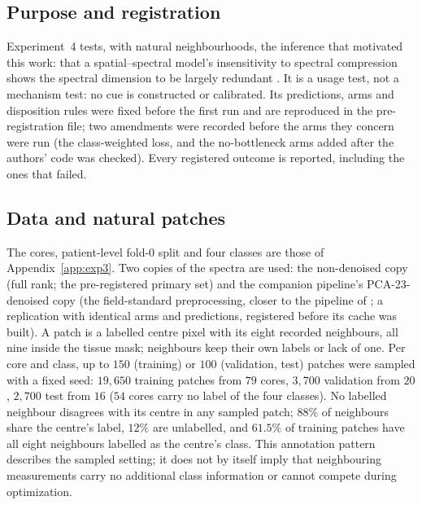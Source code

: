 
\subsection{Purpose and registration}
Experiment~4 tests, with natural neighbourhoods, the inference that motivated this
work: that a spatial--spectral model's insensitivity to spectral compression shows the
spectral dimension to be largely redundant \citep{oleary2026spatial,mueller2023dimred}.
It is a usage test, not a mechanism test: no cue is constructed or calibrated. Its
predictions, arms and disposition rules were fixed before the first run and are
reproduced in the pre-registration file; two amendments were recorded before the
arms they concern were run (the class-weighted loss, and the no-bottleneck arms
added after the authors' code was checked). Every registered outcome is reported,
including the ones that failed.

\subsection{Data and natural patches}
The cores, patient-level fold-0 split and four classes are those of
Appendix~\ref{app:exp3}. Two copies of the spectra are used: the non-denoised copy
(full rank; the pre-registered primary set) and the companion pipeline's
PCA-23-denoised copy (the field-standard preprocessing, closer to the pipeline of
\citet{oleary2026spatial}; a replication with identical arms and predictions,
registered before its cache was built). A patch is a labelled centre pixel with its
eight recorded neighbours, all nine inside the tissue mask; neighbours keep their own
labels or lack of one. Per core and class, up to $150$ (training) or $100$
(validation, test) patches were sampled with a fixed seed: $19{,}650$ training patches
from $79$ cores, $3{,}700$ validation from $20$, $2{,}700$ test from $16$ ($54$ cores
carry no label of the four classes). No labelled neighbour disagrees with its centre in
any sampled patch; $88\%$ of neighbours share the centre's label, $12\%$ are unlabelled,
and $61.5\%$ of training patches have all eight neighbours labelled as the centre's
class. This annotation pattern describes the sampled setting; it does not by itself
imply that neighbouring measurements carry no additional class information or cannot
compete during optimization.

